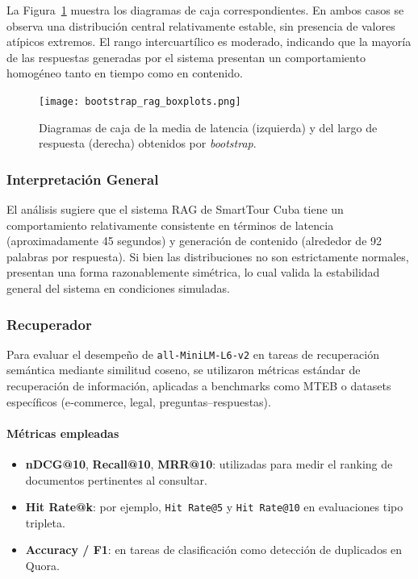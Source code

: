 \documentclass[runningheads]{llncs}
\begin{document}
La Figura~\ref{fig:bootstrap_boxplots} muestra los diagramas de caja correspondientes. En ambos casos se observa una distribución central relativamente estable, sin presencia de valores atípicos extremos. El rango intercuartílico es moderado, indicando que la mayoría de las respuestas generadas por el sistema presentan un comportamiento homogéneo tanto en tiempo como en contenido.

\begin{figure}[H]
    \centering
    \texttt{[image: bootstrap\_rag\_boxplots.png]}
    \caption{Diagramas de caja de la media de latencia (izquierda) y del largo de respuesta (derecha) obtenidos por \textit{bootstrap}.}
    \label{fig:bootstrap_boxplots}
\end{figure}

\subsubsection{Interpretación General}

El análisis sugiere que el sistema RAG de SmartTour Cuba tiene un comportamiento relativamente consistente en términos de latencia (aproximadamente 45 segundos) y generación de contenido (alrededor de 92 palabras por respuesta). Si bien las distribuciones no son estrictamente normales, presentan una forma razonablemente simétrica, lo cual valida la estabilidad general del sistema en condiciones simuladas.

\subsubsection{Recuperador}

Para evaluar el desempeño de \texttt{all-MiniLM-L6-v2} en tareas de recuperación semántica mediante similitud coseno, se utilizaron métricas estándar de recuperación de información, aplicadas a benchmarks como MTEB o datasets específicos (e‑commerce, legal, preguntas–respuestas).

\paragraph{Métricas empleadas}
\begin{itemize}
  \item \textbf{nDCG@10}, \textbf{Recall@10}, \textbf{MRR@10}: utilizadas para medir el ranking de documentos pertinentes al consultar.
  \item \textbf{Hit Rate@k}: por ejemplo, \texttt{Hit Rate@5} y \texttt{Hit Rate@10} en evaluaciones tipo tripleta.
  \item \textbf{Accuracy / F1}: en tareas de clasificación como detección de duplicados en Quora.
\end{itemize}
\end{document}
